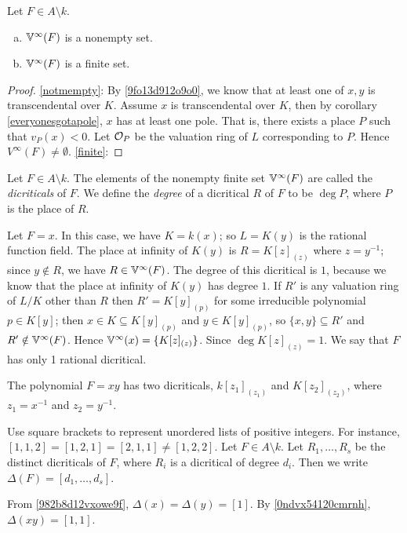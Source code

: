 \begin{proposition} \label {3o9jdb9182so}
	Let $F \in A \setminus  k$.
	\begin{enumerate}[(a)]
	\item \label{notmempty} $\mathbb{V}^\infty(F)$ is a nonempty set.
	\item \label{finite} $\mathbb{V}^\infty(F)$ is a finite set.
	\end{enumerate}
\end{proposition}

\begin{proof}
	\eqref{notmempty}: By \ref{9fo13d912o9o0}, 
	we know that at least one of $x,y$ is transcendental 
	over $K$. Assume $x$ is transcendental over $K$, then by 
	corollary \ref{everyonesgotapole}, $x$ has at least one pole. 
	That is, there exists 
	a place $P$ such that $v_P(x)<0$. Let $\mathcal{O}_P$ be 
	the valuation ring of $L$ corresponding to $P$. Hence $V^{\infty}(F) \neq \emptyset$. 
	\eqref{finite}:
\end{proof}

\begin{definition}
	Let $F \in A \setminus  k$.
	The elements of the nonempty finite set $\mathbb{V}^\infty(F)$ are called the {\it dicriticals\/} of $F$.
	We define the {\it degree\/} of a dicritical $R$ of $F$ to be $\deg P$, where
	$P$ is the place of $R$.
\end{definition}

\begin{example} \label {982b8d12vxowe9f}
	Let $F=x$. In this case, we have $K= k(x)$; 
	so $L=K(y)$ is the rational function field.
	The place at infinity of $K(y)$ is $R = K[ z ]_{(z)}$ where $z = y^{-1}$;
	since $y \notin R$, we have $R \in \mathbb{V}^\infty(F)$.  
	The degree of this dicritical is $1$,
	because we know that the place at infinity of $K(y)$ has degree $1$.
	If $R'$ is any valuation ring of $L/K$ other than $R$
	then $R' = K[y]_{(p)}$ for some irreducible polynomial $p \in K[y]$;
	then $x \in K \subseteq K[y]_{(p)}$ and $y \in K[y]_{(p)}$, 
	so $\{x,y\} \subseteq R'$ and $R' \notin  \mathbb{V}^\infty(F)$.
	Hence  $\mathbb{V}^\infty(x) = \lbrace K[z]_{(z)} \rbrace$. Since 
	$\deg K[z]_{(z)} = 1$. We say that $F$ has only 1 rational 
	dicritical. 
\end{example}

\begin{example} \label {0ndvx54120cmrnh}
	The polynomial $F=xy$ has two dicriticals, $k[z_1]_{(z_1)}$ 
	and $K[z_2]_{(z_2)}$, where $z_1=x^{-1}$ and $z_2=y^{-1}$. 
\end{example}


\begin{definition}
	Use square brackets to represent unordered lists of positive integers.
	For instance, $[1,1,2] = [1,2,1] = [2,1,1] \neq [1,2,2]$. Let $F \in A \setminus  k$.
	Let $R_1, \dots, R_s$ be the distinct dicriticals of $F$, where $R_i$ is a dicritical of degree $d_i$.
	Then we write $\Delta(F) = [ d_1, \dots, d_s ]$.
\end{definition}

\begin{examples}
	From \ref{982b8d12vxowe9f}, $\Delta(x) = \Delta(y) = [1]$.
	By \ref{0ndvx54120cmrnh}, $\Delta(xy)=[1,1]$.
\end{examples}
